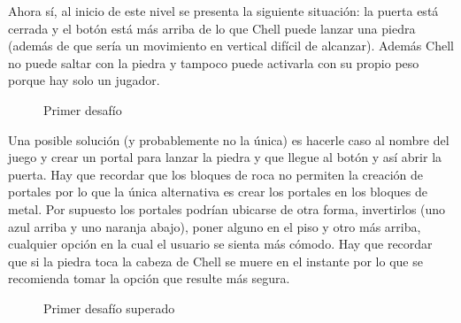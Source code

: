 \documentclass[a4paper]{article}
\begin{document}
Ahora sí, al inicio de este nivel se presenta la siguiente situación: la puerta está cerrada y el botón está más arriba de lo que Chell puede lanzar una piedra (además de que sería un movimiento en vertical difícil de alcanzar). Además Chell no puede saltar con la piedra y tampoco puede activarla con su propio peso porque hay solo un jugador.

\begin{figure}[!h]
	\caption{Primer desafío}
	\label{fig:diagrama4}
\end{figure}

\newpage

Una posible solución (y probablemente no la única) es hacerle caso al nombre del juego y crear un portal para lanzar la piedra y que llegue al botón y así abrir la puerta. Hay que recordar que los bloques de roca no permiten la creación de portales por lo que la única alternativa es crear los portales en los bloques de metal. Por supuesto los portales podrían ubicarse de otra forma, invertirlos (uno azul arriba y uno naranja abajo), poner alguno en el piso y otro más arriba, cualquier opción en la cual el usuario se sienta más cómodo. Hay que recordar que si la piedra toca la cabeza de Chell se muere en el instante por lo que se recomienda tomar la opción que resulte más segura.

\begin{figure}[!h]
	\caption{Primer desafío superado}
	\label{fig:diagrama5}
\end{figure}
\end{document}
